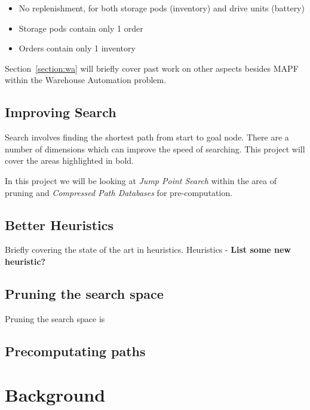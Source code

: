 \documentclass[a4paper,11pt]{article}
\begin{document}
\begin{itemize}
	\item No replenishment, for both storage pods (inventory) and drive units (battery)
	\item Storage pods contain only 1 order
	\item Orders contain only 1 inventory
\end{itemize}

Section~\ref{section:wa} will briefly cover past work on other aspects besides MAPF within the Warehouse Automation problem.


\subsection{Improving Search}
Search involves finding the shortest path from start to goal node. There are a number of dimensions which can improve the speed of searching. This project will cover the areas highlighted in bold.


In this project we will be looking at \textit{Jump Point Search} within the area of pruning and \textit{Compressed Path Databases} for pre-computation.

\subsection{Better Heuristics}
Briefly covering the state of the art in heuristics.
Heuristics - \textbf{List some new heuristic?} \blindtext

\subsection{Pruning the search space}
Pruning the search space is 

\subsection{Precomputating paths}


\cite{delling2009engineering} 


\newpage

\section{Background}
\label{background}
\end{document}

